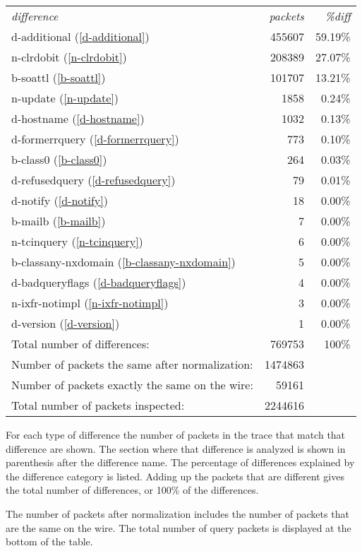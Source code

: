 \documentclass[twoside,titlepage,english]{nlnetlabs}
\begin{document}
\begin{tabular}{lrr}
{\em difference}			& {\em packets} & {\em \%diff}	\\
d-additional (\ref{d-additional}) 	&        455607 & 59.19\%	\\
n-clrdobit (\ref{n-clrdobit})		&        208389 & 27.07\%	\\
b-soattl (\ref{b-soattl})		&        101707 & 13.21\%	\\
n-update (\ref{n-update})		&          1858 & 0.24\%	\\
d-hostname (\ref{d-hostname})		&          1032 & 0.13\%	\\
d-formerrquery (\ref{d-formerrquery})	&           773 & 0.10\%	\\
b-class0 (\ref{b-class0})		&           264 & 0.03\%	\\
d-refusedquery (\ref{d-refusedquery})	&            79 & 0.01\%	\\
d-notify (\ref{d-notify})		&            18 & 0.00\%	\\
b-mailb (\ref{b-mailb})			&             7 & 0.00\%	\\
n-tcinquery (\ref{n-tcinquery})		&             6 & 0.00\%	\\
b-classany-nxdomain (\ref{b-classany-nxdomain})	&     5 & 0.00\%	\\
d-badqueryflags (\ref{d-badqueryflags})	&             4 & 0.00\%	\\
n-ixfr-notimpl (\ref{n-ixfr-notimpl})	&             3 & 0.00\%	\\
d-version (\ref{d-version})		&             1 & 0.00\%	\\
Total number of differences:            &        769753 & 100\%	\\
Number of packets the same after normalization:&1474863	\\
Number of packets exactly the same on the wire:&  59161	\\
Total number of packets inspected:             &2244616	\\
\end{tabular}

For each type of difference the number of packets in the trace that
match that difference are shown. The section where that difference
is analyzed is shown in parenthesis after the difference name.
The percentage of differences
explained by the difference category is listed.  Adding up the packets
that are different gives the total number of differences, or 100\%
of the differences.

The number of packets after normalization includes the number of
packets that are the same on the wire.  
The total number of query packets is displayed at the bottom of the table.
\end{document}
